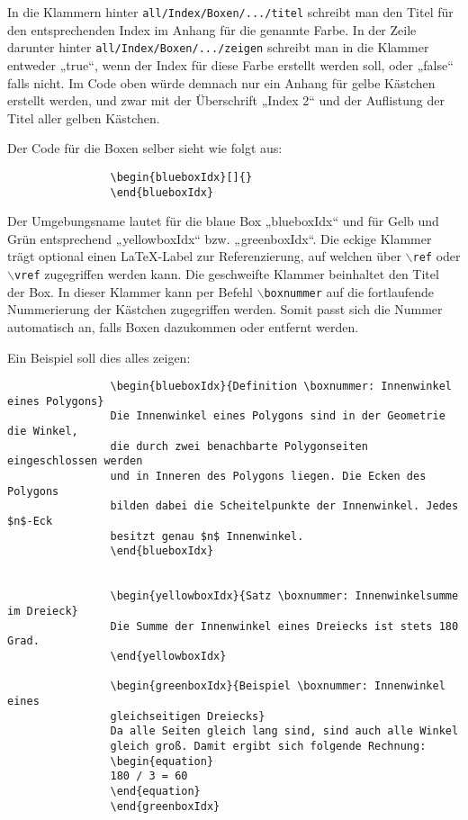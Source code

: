 				In die Klammern hinter \texttt{all/Index/Boxen/.../titel} schreibt man den Titel für den entsprechenden Index im Anhang für die genannte Farbe. In der Zeile darunter hinter \texttt{all/Index/Boxen/.../zeigen} schreibt man in die Klammer entweder „true“, wenn der Index für diese Farbe erstellt werden soll, oder „false“ falls nicht. Im Code oben würde demnach nur ein Anhang für gelbe Kästchen erstellt werden, und zwar mit der Überschrift „Index 2“ und der Auflistung der Titel aller gelben Kästchen. 
				
				Der Code für die Boxen selber sieht wie folgt aus: 
				
				\begin{verbatim}
				\begin{blueboxIdx}[]{}
				\end{blueboxIdx}
				\end{verbatim}
				
				Der Umgebungsname lautet für die blaue Box „blueboxIdx“ und für Gelb und Grün entsprechend „yellowboxIdx“ bzw. „greenboxIdx“. Die eckige Klammer trägt optional einen \LaTeX{}-Label zur Referenzierung, auf welchen über \texttt{$\backslash$ref} oder \texttt{$\backslash$vref} zugegriffen werden kann. Die geschweifte Klammer beinhaltet den Titel der Box. In dieser Klammer kann per Befehl \texttt{$\backslash$boxnummer} auf die fortlaufende Nummerierung der Kästchen zugegriffen werden. Somit passt sich die Nummer automatisch an, falls Boxen dazukommen oder entfernt werden. 
				
				Ein Beispiel soll dies alles zeigen: \newline
				
				\begin{verbatim}
				\begin{blueboxIdx}{Definition \boxnummer: Innenwinkel eines Polygons}
				Die Innenwinkel eines Polygons sind in der Geometrie die Winkel, 
				die durch zwei benachbarte Polygonseiten eingeschlossen werden 
				und in Inneren des Polygons liegen. Die Ecken des Polygons 
				bilden dabei die Scheitelpunkte der Innenwinkel. Jedes $n$-Eck 
				besitzt genau $n$ Innenwinkel. 
				\end{blueboxIdx}
				
				
				\begin{yellowboxIdx}{Satz \boxnummer: Innenwinkelsumme im Dreieck}
				Die Summe der Innenwinkel eines Dreiecks ist stets 180 Grad.
				\end{yellowboxIdx}
				
				\begin{greenboxIdx}{Beispiel \boxnummer: Innenwinkel eines 
				gleichseitigen Dreiecks}
				Da alle Seiten gleich lang sind, sind auch alle Winkel 
				gleich groß. Damit ergibt sich folgende Rechnung: 
				\begin{equation}
				180 / 3 = 60
				\end{equation}
				\end{greenboxIdx}
				\end{verbatim}
				
